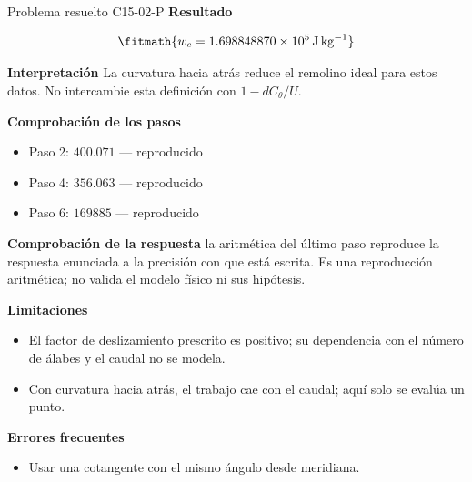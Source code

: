 \documentclass[10pt,openany]{book}
\begin{document}
\begin{studiumworked}{Problema resuelto C15-02-P}
\noindent\textbf{Resultado}

\[
\fitmath{w_c=1.698848870\times10^{5}\,\mathrm{J}\,\mathrm{kg}^{-1}}
\]

\noindent\textbf{Interpretación}
La curvatura hacia atrás reduce el remolino ideal para estos datos. No intercambie esta definición con $1-dC_\theta/U$.

\noindent\textbf{Comprobación de los pasos}
\begin{itemize}
\item Paso 2: $400.071$ — reproducido
\item Paso 4: $356.063$ — reproducido
\item Paso 6: $169885$ — reproducido
\end{itemize}

\noindent\textbf{Comprobación de la respuesta} la aritmética del último paso reproduce la respuesta enunciada a la precisión con que está escrita. Es una reproducción aritmética; no valida el modelo físico ni sus hipótesis.

\noindent\textbf{Limitaciones}
\begin{itemize}
\item El factor de deslizamiento prescrito es positivo; su dependencia con el número de álabes y el caudal no se modela.
\item Con curvatura hacia atrás, el trabajo cae con el caudal; aquí solo se evalúa un punto.
\end{itemize}

\noindent\textbf{Errores frecuentes}
\begin{itemize}
\item Usar una cotangente con el mismo ángulo desde meridiana.
\end{itemize}
\end{studiumworked}
\end{document}
